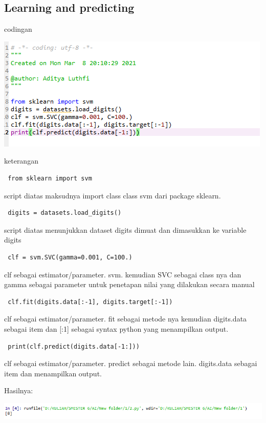 \documentclass{article}
\begin{document}
\subsection{Learning and predicting}

codingan

\begin{center}
    \includegraphics[width=.8\textwidth]{figures/1184090/chapter1/4.PNG}
\end{center}

keterangan
\begin{verbatim} from sklearn import svm \end{verbatim} script diatas maksudnya import class class svm dari package sklearn.
		
		\begin{verbatim} digits = datasets.load_digits() \end{verbatim} script diatas menunjukkan  dataset digits dimuat dan dimasukkan ke variable digits
			
		\begin{verbatim} clf = svm.SVC(gamma=0.001, C=100.)  \end{verbatim} clf sebagai estimator/parameter. svm. kemudian SVC sebagai class nya dan gamma sebagai parameter untuk penetapan nilai yang dilakukan secara manual

		
		\begin{verbatim} clf.fit(digits.data[:-1], digits.target[:-1])  \end{verbatim} clf sebagai estimator/parameter. fit sebagai metode nya kemudian digits.data sebagai item dan [:1] sebagai syntax python yang menampilkan output.
		
		\begin{verbatim} print(clf.predict(digits.data[-1:]))  \end{verbatim} clf sebagai estimator/parameter. predict sebagai metode lain. digits.data sebagai item dan menampilkan output.

Hasilnya:
\begin{center}
    \includegraphics[width=.8\textwidth]{figures/1184090/chapter1/5.PNG}
\end{center}
\end{document}
